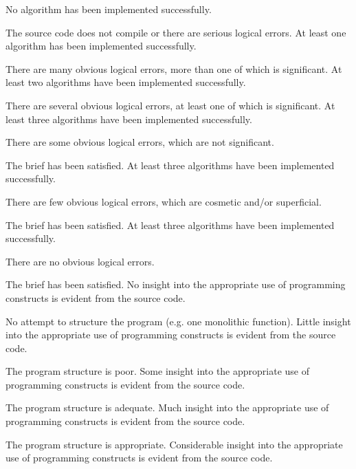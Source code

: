\documentclass{fal_assignment}
\begin{document}
\begin{markingrubric}
%
        \grade\fail 	No algorithm has been implemented successfully.
            \par 		The source code does not compile or there are serious logical errors.
        \grade 		At least one algorithm has been  implemented successfully.
            \par 		There are many obvious logical errors, more than one of which is significant.   
        \grade 		At least two algorithms have been  implemented successfully.
            \par 		There are several obvious logical errors, at least one of which is significant. 
        \grade 		At least three algorithms have been  implemented successfully.
            \par 		There are some obvious logical errors, which are not significant. 
            \par		The brief has been satisfied.
        \grade 		At least three algorithms have been  implemented successfully.
            \par 		There are few obvious logical errors, which are cosmetic and/or superficial.
            \par		The brief has been satisfied.     
        \grade 		At least three algorithms have been  implemented successfully.
            \par		There are no obvious logical errors.
            \par		The brief has been satisfied.
%
        \grade\fail No insight into the appropriate use of programming constructs is evident from the source code.
            \par No attempt to structure the program (e.g. one monolithic function).
        \grade Little insight into the appropriate use of programming constructs is evident from the source code.
            \par The program structure is poor.
        \grade Some insight into the appropriate use of programming constructs is evident from the source code.
            \par The program structure is adequate.
        \grade Much insight into the appropriate use of programming constructs is evident from the source code.
            \par The program structure is appropriate.
        \grade Considerable insight into the appropriate use of programming constructs is evident from the source code.

\end{markingrubric}
\end{document}
